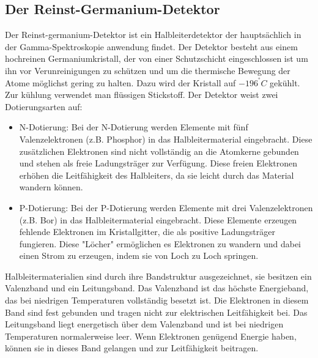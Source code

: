 \subsection{Der Reinst-Germanium-Detektor}
Der Reinst-germanium-Detektor ist ein Halbleiterdetektor der hauptsächlich in der Gamma-Spektroskopie anwendung findet. Der Detektor besteht aus
einem hochreinen Germaniumkristall, der von einer Schutzschicht eingeschlossen ist um ihn vor Verunreinigungen zu schützen und um die 
thermische Bewegung der Atome möglichst gering zu halten. Dazu wird der Kristall auf $-196^°C$ gekühlt. Zur kühlung verwendet man flüssigen Stickstoff.
Der Detektor weist zwei Dotierungsarten auf:
\begin{itemize}
\item N-Dotierung: Bei der N-Dotierung werden Elemente mit fünf Valenzelektronen (z.B. Phosphor) in das Halbleitermaterial eingebracht. 
Diese zusätzlichen Elektronen sind nicht vollständig an die Atomkerne gebunden und stehen als freie Ladungsträger zur Verfügung. Diese freien Elektronen
erhöhen die Leitfähigkeit des Halbleiters, da sie leicht durch das Material wandern können.
\item P-Dotierung: Bei der P-Dotierung werden Elemente mit drei Valenzelektronen (z.B. Bor) in das Halbleitermaterial eingebracht.
Diese Elemente erzeugen fehlende Elektronen im Kristallgitter, die als positive Ladungsträger fungieren. Diese "Löcher" ermöglichen es Elektronen
zu wandern und dabei einen Strom zu erzeugen, indem sie von Loch zu Loch springen.
\end{itemize}
Halbleitermaterialien sind durch ihre Bandstruktur ausgezeichnet, sie besitzen ein Valenzband und ein Leitungsband.
Das Valenzband ist das höchste Energieband, das bei niedrigen Temperaturen vollständig besetzt ist. Die Elektronen in diesem Band sind fest
gebunden und tragen nicht zur elektrischen Leitfähigkeit bei. Das Leitungsband liegt energetisch über dem Valenzband und ist bei niedrigen Temperaturen 
normalerweise leer. Wenn Elektronen genügend Energie haben, können sie in dieses Band gelangen und zur Leitfähigkeit beitragen.


